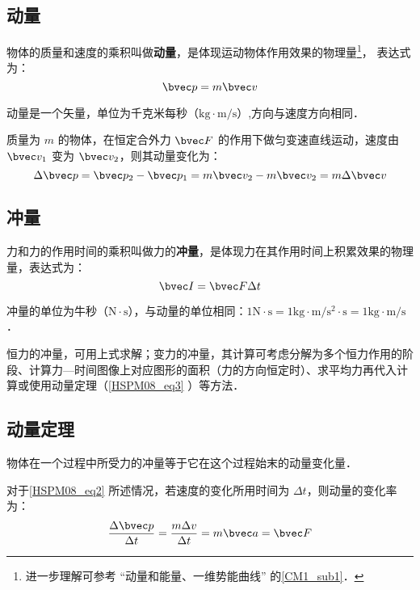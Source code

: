 

\subsection{动量}

物体的质量和速度的乘积叫做\textbf{动量}，是体现运动物体作用效果的物理量\footnote{进一步理解可参考 “动量和能量、一维势能曲线” 的\autoref{CM1_sub1}．}， 表达式为：
\begin{equation}
\bvec p = m\bvec v
\end{equation}

动量是一个矢量，单位为千克米每秒（$\mathrm{kg\cdot m/s}$）,方向与速度方向相同．

质量为 $m$ 的物体，在恒定合外力 $\bvec F $ 的作用下做匀变速直线运动，速度由 $\bvec v_1$ 变为 $\bvec v_2$，则其动量变化为：
\begin{equation}\label{HSPM08_eq2}
\Delta \bvec p =\bvec p_2 - \bvec p_1 = m\bvec v_2 - m\bvec v_2 = m\Delta \bvec v
\end{equation}

\subsection{冲量}

力和力的作用时间的乘积叫做力的\textbf{冲量}，是体现力在其作用时间上积累效果的物理量，表达式为：
\begin{equation}
\bvec I=\bvec F \Delta t
\end{equation}

冲量的单位为牛秒（$\mathrm{N\cdot s}$），与动量的单位相同：$1\mathrm{N\cdot s}=1\mathrm{kg\cdot m/s^2 \cdot s}=1\mathrm{kg\cdot m/s}$．

恒力的冲量，可用上式求解；变力的冲量，其计算可考虑分解为多个恒力作用的阶段、计算力—时间图像上对应图形的面积（力的方向恒定时）、求平均力再代入计算或使用动量定理（\autoref{HSPM08_eq3}  ）等方法．

\subsection{动量定理}

物体在一个过程中所受力的冲量等于它在这个过程始末的动量变化量．

对于\autoref{HSPM08_eq2} 所述情况，若速度的变化所用时间为 $\Delta t$，则动量的变化率为：
\begin{equation}\label{HSPM08_eq1}
\frac{\Delta \bvec p}{\Delta t}=\frac{m\Delta v}{\Delta t}=m\bvec a=\bvec F
\end{equation}

